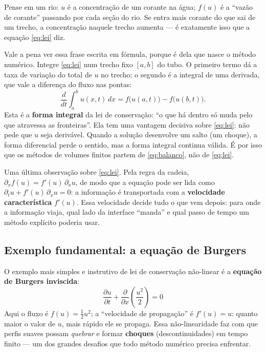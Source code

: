 \documentclass[10pt,a4paper]{article}
\newcommand{\pd}[2]{\frac{\partial #1}{\partial #2}}
\begin{document}
\begin{intuicao}
Pense em um rio: $u$ é a concentração de um corante na água; $f(u)$ é a ``vazão de corante'' passando por cada seção do rio. Se entra mais corante do que sai de um trecho, a concentração naquele trecho aumenta --- é exatamente isso que a equação \eqref{eq:lei} diz.
\end{intuicao}

Vale a pena ver essa frase escrita em fórmula, porque é dela que nasce o método numérico. Integre \eqref{eq:lei} num trecho fixo $[a,b]$ do tubo. O primeiro termo dá a taxa de variação do total de $u$ no trecho; o segundo é a integral de uma derivada, que vale a diferença do fluxo nas pontas:
\begin{equation}\label{eq:balanco}
\frac{d}{dt}\int_a^b u(x,t)\,dx=f\big(u(a,t)\big)-f\big(u(b,t)\big).
\end{equation}
Esta é a \textbf{forma integral} da lei de conservação: ``o que há dentro só muda pelo que atravessa as fronteiras''. Ela tem uma vantagem decisiva sobre \eqref{eq:lei}: não pede que $u$ seja derivável. Quando a solução desenvolve um salto (um choque), a forma diferencial perde o sentido, mas a forma integral continua válida. É por isso que os métodos de volumes finitos partem de \eqref{eq:balanco}, não de \eqref{eq:lei}.

Uma última observação sobre \eqref{eq:lei}. Pela regra da cadeia, $\partial_x f(u)=f'(u)\,\partial_xu$, de modo que a equação pode ser lida como $\partial_tu+f'(u)\,\partial_xu=0$: a informação é transportada com a \textbf{velocidade característica} $f'(u)$. Essa velocidade decide tudo o que vem depois: para onde a informação viaja, qual lado da interface ``manda'' e qual passo de tempo um método explícito poderia usar.

\subsection{Exemplo fundamental: a equação de Burgers}

O exemplo mais simples e instrutivo de lei de conservação não-linear é a \textbf{equação de Burgers inviscida}:
\begin{equation}\label{eq:burgers}
\pd{u}{t}+\pd{}{x}\left(\frac{u^2}{2}\right)=0
\end{equation}
Aqui o fluxo é $f(u)=\tfrac12u^2$; a ``velocidade de propagação'' é $f'(u)=u$: quanto maior o valor de $u$, mais rápido ele se propaga. Essa não-linearidade faz com que perfis suaves possam \emph{quebrar} e formar \textbf{choques} (descontinuidades) em tempo finito --- um dos grandes desafios que todo método numérico precisa enfrentar.
\end{document}
